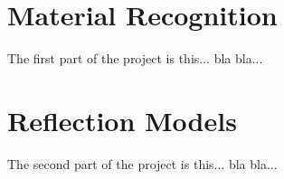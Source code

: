 \hypertarget{MaterialRecognition}{
\section{Material Recognition}
\label{MaterialRecognition}
}
The first part of the project is this...
bla bla...


\hypertarget{ReflectionModels}{
\section{Reflection Models}
\label{ReflectionModels}
}
The second part of the project is this...
bla bla...



